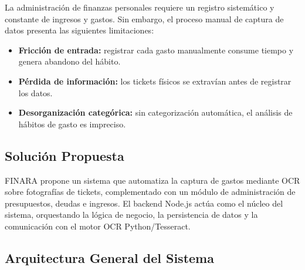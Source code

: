 La administración de finanzas personales requiere un registro sistemático y constante de ingresos y gastos. Sin embargo, el proceso manual de captura de datos presenta las siguientes limitaciones:

\begin{itemize}[leftmargin=1.5cm]
  \item \textbf{Fricción de entrada:} registrar cada gasto manualmente consume tiempo y genera abandono del hábito.
  \item \textbf{Pérdida de información:} los tickets físicos se extravían antes de registrar los datos.
  \item \textbf{Desorganización categórica:} sin categorización automática, el análisis de hábitos de gasto es impreciso.
\end{itemize}

\subsection{Solución Propuesta}

FINARA propone un sistema que automatiza la captura de gastos mediante OCR sobre fotografías de tickets, complementado con un módulo de administración de presupuestos, deudas e ingresos. El backend Node.js actúa como el núcleo del sistema, orquestando la lógica de negocio, la persistencia de datos y la comunicación con el motor OCR Python/Tesseract.

\subsection{Arquitectura General del Sistema}

